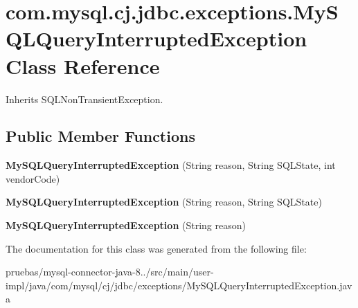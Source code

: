 \hypertarget{classcom_1_1mysql_1_1cj_1_1jdbc_1_1exceptions_1_1_my_s_q_l_query_interrupted_exception}{}\section{com.\+mysql.\+cj.\+jdbc.\+exceptions.\+My\+S\+Q\+L\+Query\+Interrupted\+Exception Class Reference}
\label{classcom_1_1mysql_1_1cj_1_1jdbc_1_1exceptions_1_1_my_s_q_l_query_interrupted_exception}


Inherits S\+Q\+L\+Non\+Transient\+Exception.

\subsection*{Public Member Functions}
\begin{DoxyCompactItemize}
\item 
\mbox{\label{classcom_1_1mysql_1_1cj_1_1jdbc_1_1exceptions_1_1_my_s_q_l_query_interrupted_exception_a9edfa54b7f9d22a146fda951e4729776}} 
{\bfseries My\+S\+Q\+L\+Query\+Interrupted\+Exception} (String reason, String S\+Q\+L\+State, int vendor\+Code)
\item 
\mbox{\label{classcom_1_1mysql_1_1cj_1_1jdbc_1_1exceptions_1_1_my_s_q_l_query_interrupted_exception_a196666b8454b4d0e206563c119797d84}} 
{\bfseries My\+S\+Q\+L\+Query\+Interrupted\+Exception} (String reason, String S\+Q\+L\+State)
\item 
\mbox{\label{classcom_1_1mysql_1_1cj_1_1jdbc_1_1exceptions_1_1_my_s_q_l_query_interrupted_exception_ad105edbe581390691fb6f0a4b63ecd72}} 
{\bfseries My\+S\+Q\+L\+Query\+Interrupted\+Exception} (String reason)
\end{DoxyCompactItemize}


The documentation for this class was generated from the following file\+:\begin{DoxyCompactItemize}
\item 
pruebas/mysql-\/connector-\/java-\/8../src/main/user-\/impl/java/com/mysql/cj/jdbc/exceptions/My\+S\+Q\+L\+Query\+Interrupted\+Exception.\+java\end{DoxyCompactItemize}
